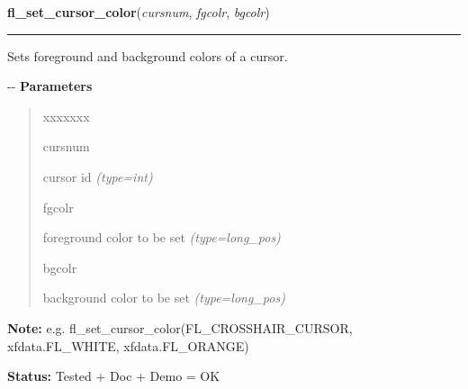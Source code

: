 \hspace{.8\funcindent}\begin{boxedminipage}{\funcwidth}

    \raggedright \textbf{fl\_set\_cursor\_color}(\textit{cursnum}, \textit{fgcolr}, \textit{bgcolr})

    \vspace{-1.5ex}

    \rule{\textwidth}{0.5\fboxrule}
\setlength{\parskip}{2ex}

Sets foreground and background colors of a cursor.

-{}-
\setlength{\parskip}{1ex}
      \textbf{Parameters}
      \vspace{-1ex}

      \begin{quote}
        \begin{Ventry}{xxxxxxx}

          \item[cursnum]


cursor id
            {\it (type=int)}

          \item[fgcolr]


foreground color to be set
            {\it (type=long\_pos)}

          \item[bgcolr]


background color to be set
            {\it (type=long\_pos)}

        \end{Ventry}

      \end{quote}

\textbf{Note:} 
e.g. fl\_set\_cursor\_color(FL\_CROSSHAIR\_CURSOR, xfdata.FL\_WHITE,
xfdata.FL\_ORANGE)


\textbf{Status:} 
Tested + Doc + Demo = OK


    \end{boxedminipage}

    \label{xformslib:flcursor:fl_create_bitmap_cursor}

    \vspace{0.5ex}

